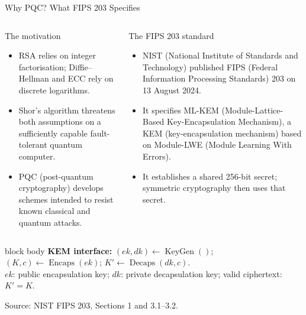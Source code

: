 \documentclass[aspectratio=169,11pt]{beamer}
\newcommand{\source}[1]{\par\vspace{-0.15cm}\hfill{\fontsize{4.5}{5.2}\selectfont\color{Slate!65}Source: NIST FIPS 203, #1.}}
\begin{document}
\begin{frame}{Why PQC? What FIPS 203 Specifies}
  \begin{columns}[T,onlytextwidth]
      \begin{block}{The motivation}
        \footnotesize
        \begin{itemize}
          \setlength{\itemsep}{0.15em}
          \item RSA %
          relies on integer factorisation; %
          Diffie--Hellman and ECC %
          rely on discrete logarithms.
          \item Shor's algorithm threatens both assumptions on a sufficiently capable fault-tolerant quantum computer.
          \item PQC (post-quantum cryptography) develops schemes intended to resist known classical and quantum attacks.
        \end{itemize}
      \end{block}
      \begin{block}{The FIPS 203 standard}
        \footnotesize
        \begin{itemize}
          \setlength{\itemsep}{0.15em}
          \item NIST (National Institute of Standards and Technology) 
          published FIPS (Federal Information Processing Standards) 
          203 on 13 August 2024.
          \item It specifies ML-KEM (Module-Lattice-Based Key-Encapsulation Mechanism), a KEM (key-encapsulation mechanism) based on Module-LWE (Module Learning With Errors).
          \item It establishes a shared 256-bit secret; symmetric cryptography then uses that secret.
        \end{itemize}
      \end{block}
  \end{columns}
  \vspace{0.02cm}
  \begin{beamercolorbox}[rounded=true,sep=0.30em,wd=\linewidth,center]{block body}
    \scriptsize
    \textbf{KEM interface:}\quad
    $(ek,dk)\leftarrow\operatorname{KeyGen}()$;\quad
    $(K,c)\leftarrow\operatorname{Encaps}(ek)$;\quad
    $K'\leftarrow\operatorname{Decaps}(dk,c)$.\\[1pt]
    $ek$: public encapsulation key; $dk$: private decapsulation key; valid ciphertext: $K'=K$.
  \end{beamercolorbox}
  \source{Sections 1 and 3.1--3.2}
\end{frame}
\end{document}
